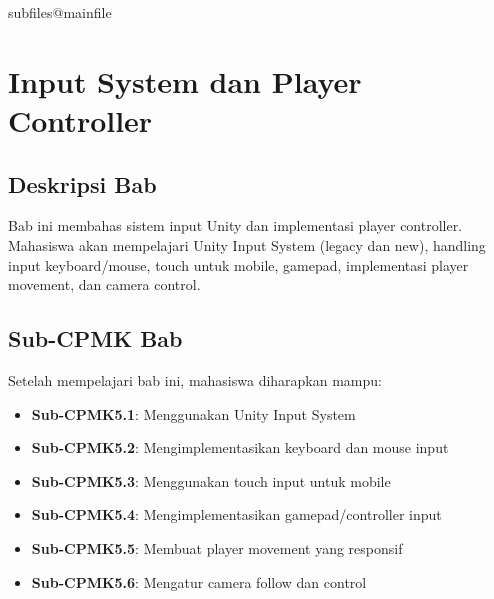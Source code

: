 \documentclass[../../main.tex]{subfiles}
\begin{document}
\ifcsname subfiles@mainfile\endcsname\else
    \setcounter{chapter}{4}
\fi
\chapter{Input System dan Player Controller}

\section{Deskripsi Bab}

Bab ini membahas sistem input Unity dan implementasi player controller. Mahasiswa akan mempelajari Unity Input System (legacy dan new), handling input keyboard/mouse, touch untuk mobile, gamepad, implementasi player movement, dan camera control.

\section{Sub-CPMK Bab}

Setelah mempelajari bab ini, mahasiswa diharapkan mampu:
\begin{itemize}
\item \textbf{Sub-CPMK5.1}: Menggunakan Unity Input System
\item \textbf{Sub-CPMK5.2}: Mengimplementasikan keyboard dan mouse input
\item \textbf{Sub-CPMK5.3}: Menggunakan touch input untuk mobile
\item \textbf{Sub-CPMK5.4}: Mengimplementasikan gamepad/controller input
\item \textbf{Sub-CPMK5.5}: Membuat player movement yang responsif
\item \textbf{Sub-CPMK5.6}: Mengatur camera follow dan control
\end{itemize}










\end{document}
